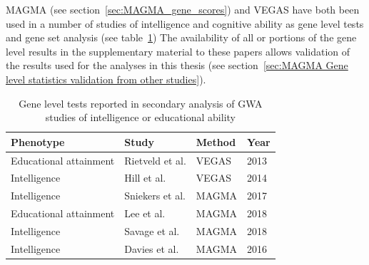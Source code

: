 MAGMA \cite{de2015magma} (see section~\ref{sec:MAGMA_gene_scores}) and VEGAS have both been used in a  number of studies of intelligence and cognitive ability as gene level tests and gene set analysis (see table~\ref{tab:Gene tests in intelligence and educational attainment studies}) The availability of all or portions of the gene level results in the supplementary material to these papers allows validation of the results used for the analyses in this thesis (see section~\ref{sec:MAGMA Gene level statistics validation from other studies}).

\begin{table}[]
    \centering
    \begin{tabular}{llll}
        \toprule
      Phenotype & Study  & Method & Year  \\
        \midrule
       Educational attainment  & Rietveld et al.\cite{rietveld2013gwas}  & VEGAS &  2013\\
      Intelligence  &Hill et al.\cite{hill2014human} & VEGAS & 2014\\
      Intelligence & Sniekers et al.\cite{sniekers2017genome} & MAGMA & 2017\\
      Educational attainment & Lee et al.\cite{lee2018gene} & MAGMA & 2018 \\
      Intelligence & Savage et al.\cite{savage2018genome}& MAGMA & 2018 \\
      Intelligence & Davies et al. \cite{davies2016genome} & MAGMA & 2016 \\
    \bottomrule
    \end{tabular}
    \caption{Gene level tests reported in secondary analysis of GWA studies of intelligence or educational ability}
    \label{tab:Gene tests in intelligence and educational attainment studies}
\end{table}











